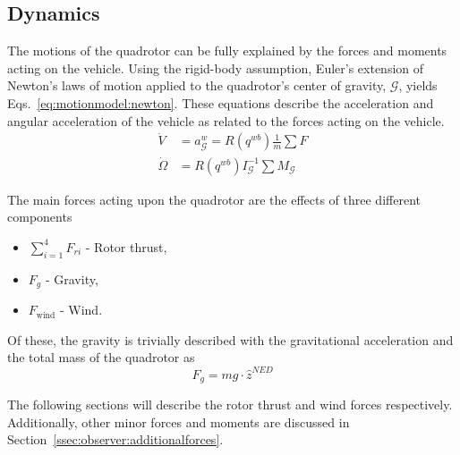     \subsection{Dynamics}
        The motions of the quadrotor can be fully explained by the
        forces and moments acting on the vehicle. Using the rigid-body assumption,
        Euler's extension of Newton's laws of motion applied to the
        quadrotor's center of gravity, $\mathcal{G}$, yields Eqs.~\ref{eq:motionmodel:newton}.
        These equations describe the acceleration and angular acceleration of the vehicle
        as related to the forces acting on the vehicle.
        \begin{subequations}
        \label{eq:motionmodel:newton}
            \begin{align}
                \dot{V} &= a^{w}_{\mathcal{G}} = R(q^{wb})\frac{1}{m}\sum F \\
                \dot{\Omega} &= R(q^{wb})I_{\mathcal{G}}^{-1}\sum M_{\mathcal{G}}
            \end{align}
        \end{subequations}

        The main forces acting upon the quadrotor are the effects of three different components
        \begin{itemize}
            \item $\sum_{i=1}^{4}F_{ri}$ - Rotor thrust,
            \item $F_{g}$ - Gravity,
            \item $F_{\text{wind}}$ - Wind.
        \end{itemize}

        Of these, the gravity is trivially described with the
        gravitational acceleration and the total mass of the quadrotor as
        \begin{equation}
            F_{g} = mg\cdot \hat{z}^{NED}
        \end{equation}

        The following sections will describe the rotor thrust and wind forces respectively.
        Additionally, other minor forces and moments are discussed in
        Section~\ref{ssec:observer:additionalforces}.

        
        
        
